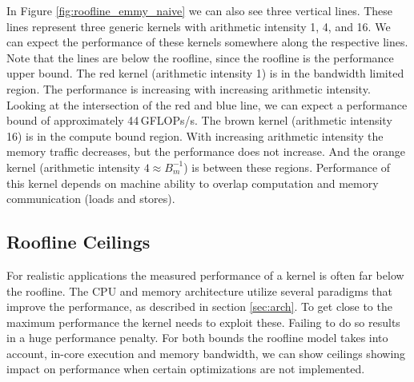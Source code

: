In Figure \ref{fig:roofline_emmy_naive} we can also see three vertical lines. These lines represent three generic kernels with arithmetic intensity 1, 4, and 16. We can expect the performance of these kernels somewhere along the respective lines.
Note that the lines are below the roofline, since the roofline is the performance upper bound.
The red kernel (arithmetic intensity 1) is in the bandwidth limited region. The performance is increasing with increasing arithmetic intensity. Looking at the intersection of the red and blue line, we can expect a performance bound of approximately 44\,GFLOPs/s.
The brown kernel (arithmetic intensity 16) is in the compute bound region. With increasing arithmetic intensity the memory traffic decreases, but the performance does not increase.
And the orange kernel (arithmetic intensity $4 \approx B_m^{-1}$) is between these regions. Performance of this kernel depends on machine ability to overlap computation and memory communication (loads and stores).



\subsection{Roofline Ceilings}

For realistic applications the measured performance of a kernel is often far below the roofline. The CPU and memory architecture utilize several paradigms that improve the performance, as described in section \ref{sec:arch}. To get close to the maximum performance the kernel needs to exploit these. Failing to do so results in a huge performance penalty.
For both bounds the roofline model takes into account, in-core execution and memory bandwidth, we can show ceilings showing impact on performance when certain optimizations are not implemented.

